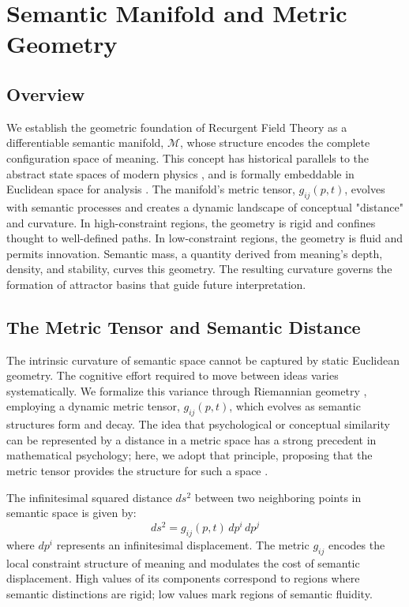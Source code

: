 \chapter{Semantic Manifold and Metric Geometry}

\section{Overview}

We establish the geometric foundation of Recurgent Field Theory as a differentiable semantic manifold, \(\mathcal{M}\), whose structure encodes the complete configuration space of meaning. This concept has historical parallels to the abstract state spaces of modern physics \autocite{vonNeumann1932}, and is formally embeddable in Euclidean space for analysis \autocite{Whitney1936}. The manifold's metric tensor, \(g_{ij}(p, t)\), evolves with semantic processes and creates a dynamic landscape of conceptual "distance" and curvature. In high-constraint regions, the geometry is rigid and confines thought to well-defined paths. In low-constraint regions, the geometry is fluid and permits innovation. Semantic mass, a quantity derived from meaning's depth, density, and stability, curves this geometry. The resulting curvature governs the formation of attractor basins that guide future interpretation.

\section{The Metric Tensor and Semantic Distance}

The intrinsic curvature of semantic space cannot be captured by static Euclidean geometry. The cognitive effort required to move between ideas varies systematically. We formalize this variance through Riemannian geometry \autocite{Riemann1868, doCarmo1992}, employing a dynamic metric tensor, \(g_{ij}(p,t)\), which evolves as semantic structures form and decay. The idea that psychological or conceptual similarity can be represented by a distance in a metric space has a strong precedent in mathematical psychology; here, we adopt that principle, proposing that the metric tensor provides the structure for such a space \autocite{Shepard1987}.

The infinitesimal squared distance \(ds^2\) between two neighboring points in semantic space is given by:
\begin{equation}
ds^2 = g_{ij}(p, t) \, dp^i \, dp^j
\end{equation}
where \(dp^i\) represents an infinitesimal displacement. The metric \(g_{ij}\) encodes the local constraint structure of meaning and modulates the cost of semantic displacement. High values of its components correspond to regions where semantic distinctions are rigid; low values mark regions of semantic fluidity.

